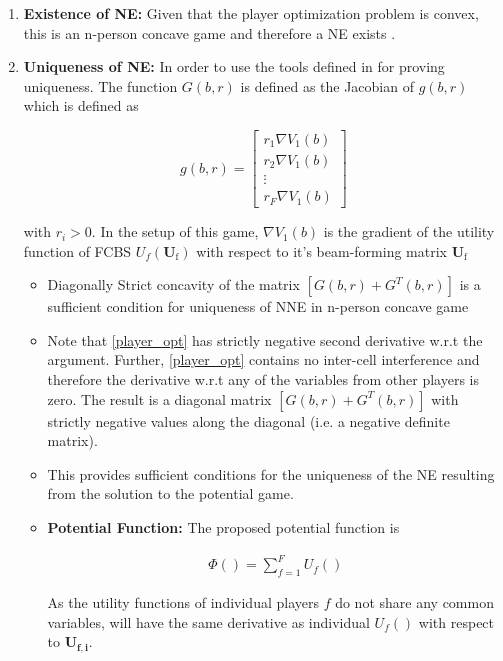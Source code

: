 \documentclass[12pt]{article}
\begin{document}
\begin{enumerate}
\item \textbf{Existence of NE:} Given that the player optimization problem is convex, this is an n-person concave game and therefore a NE exists \cite{rosen1964existence}. 
\item \textbf{Uniqueness of NE:} In order to use the tools defined in \cite[Thm6]{rosen1964existence} for proving uniqueness. The function $G(b,r) $ is defined as the Jacobian of $g(b,r) $ which is defined as 

\begin{equation}
g(b,r)= 
\begin{bmatrix}
r_1 \nabla V_{1}(b)
\\
r_2 \nabla V_{1}(b)
\\
\vdots\\
r_F \nabla V_{1}(b)
\end{bmatrix}
\end{equation}

with $r_i>0$.
In the setup of this game, $\nabla V_{1}(b)$
is the gradient of the utility function of FCBS $U_f(\mathbf{U}_{\mathrm{f}}) $ with respect to it's beam-forming matrix 
$\mathbf{U}_{\mathrm{f}}$


\begin{itemize}
\item
Diagonally Strict concavity of the matrix $[G(b,r)+G^{T}(b,r)] $ is a sufficient condition for uniqueness of NNE in n-person concave game
	
\item 
Note that \eqref{player_opt} has strictly negative second derivative w.r.t the argument. Further, \eqref{player_opt} contains no inter-cell interference and therefore the derivative w.r.t any of the variables from other players is zero. The result is a diagonal matrix $[G(b,r)+G^{T}(b,r)] $ with strictly negative values along the diagonal (i.e. a negative definite matrix). 

\item 
This provides sufficient conditions for the uniqueness of the NE resulting from the solution to the potential game. 

\item \textbf{Potential Function:} The proposed potential function is 

\begin{gather*} \label{Potential_Function}
\Phi() = \sum_{f = 1}^{F} U_f() 
\end{gather*}


As the utility functions of individual players $f$ do not share any common variables,  \label{Potential_Function} will have the same derivative as individual $U_f()$ with respect to $\mathbf{U_{f,i}} $. 


\end{itemize}

\end{enumerate}
\end{document}
